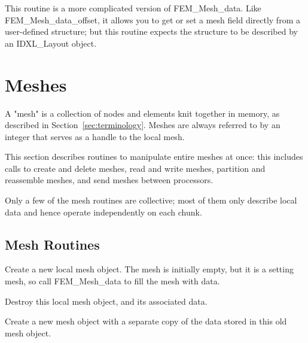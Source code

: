 This routine is a more complicated version of FEM\_Mesh\_data.
Like FEM\_Mesh\_data\_offset, it allows you to get or set a mesh
field directly from a user-defined structure; but this routine
expects the structure to be described by an IDXL\_Layout object.

\section{Meshes}
\label{sec:mesh}

A "mesh" is a collection of nodes and elements 
knit together in memory, as described in Section~\ref{sec:terminology}.
Meshes are always referred to by an integer that 
serves as a handle to the local mesh.

This section describes routines to manipulate entire meshes
at once: this includes calls to create and delete meshes,
read and write meshes,
partition and reassemble meshes, and send meshes between
processors.

Only a few of the mesh routines are collective; 
most of them only describe local data and hence 
operate independently on each chunk.


\subsection{Mesh Routines}


Create a new local mesh object.  The mesh is initially empty,
but it is a setting mesh, so call FEM\_Mesh\_data 
to fill the mesh with data.



Destroy this local mesh object, and its associated
data.



Create a new mesh object with a separate copy of the data 
stored in this old mesh object.



